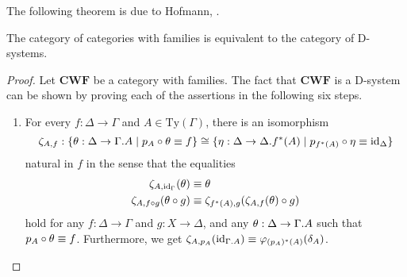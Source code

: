 The following theorem is due to Hofmann, \cite[section 3.2]{Hofmann_syntax_semantics}. 

\begin{thm}\label{thm:DD}
The category of categories with families is equivalent to the category of 
D-systems.%
\end{thm}

\begin{comment}
Since this theorem basically asserts that a category with families is a
comprehension category
\end{comment}

\begin{proof}%
Let $\mathbf{CWF}$ be a category with families. The fact that $\mathbf{CWF}$ is
a D-system can be shown by proving each of the assertions in the following six 
steps.
\begin{enumerate}
\item For every $f:\Delta\to\Gamma$ and $A\in\mathrm{Ty}(\Gamma)$, there is an
isomorphism
\begin{equation*}
\zeta_{A,f}:\{\theta:\Delta\to\ctxext{\Gamma}{A}\mid p_A\circ\theta\jdeq f\}
  \cong
\{\eta:\Delta\to\ctxext{\Delta}{f^\ast(A)}\mid p_{f^\ast(A)}\circ\eta\jdeq\catid{\Delta}\}
\end{equation*}
natural in $f$ in the sense that the equalities
\begin{align*}
\zeta_{A,{\mathrm{id}_{\Gamma}}}(\theta) & \equiv \theta \\
\zeta_{A,f\circ g}(\theta\circ g) & \equiv \zeta_{f^\ast(A),g}(\zeta_{A,f}(\theta)\circ g)
\end{align*}
hold for any $f:\Delta\to\Gamma$ and $g:X\to\Delta$, and any $\theta:\Delta\to\ctxext{\Gamma}{A}$
such that $p_A\circ\theta\equiv f$.
Furthermore, we get $\zeta_{A,p_A}(\catid{\ctxext{\Gamma}{A}})\jdeq\varphi_{(p_A)^\ast(A)}(\delta_A)$.


\end{enumerate}
\end{proof}
